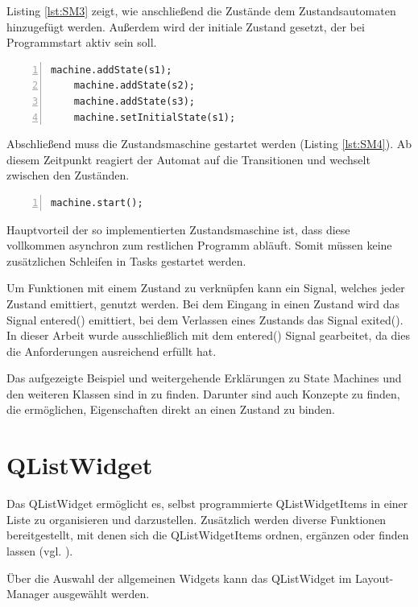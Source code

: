 Listing \ref{lst:SM3} zeigt, wie anschließend die Zustände dem Zustandsautomaten hinzugefügt werden. Außerdem wird der initiale Zustand gesetzt, der bei Programmstart aktiv sein soll. 

\begin{lstlisting}[frame=single, breaklines=true, numbers=left, stepnumber=2, firstnumber=1, numberstyle = \tiny, caption=State Machine Beispiel Teil 3 ,label=lst:SM3]
    machine.addState(s1);
    machine.addState(s2);
    machine.addState(s3);
    machine.setInitialState(s1);
\end{lstlisting}

Abschließend muss die Zustandsmaschine gestartet werden (Listing \ref{lst:SM4}). Ab diesem Zeitpunkt reagiert der Automat auf die Transitionen und wechselt zwischen den Zuständen. 

\begin{lstlisting}[frame=single, breaklines=true, numbers=left, stepnumber=2, firstnumber=1, numberstyle = \tiny, caption=State Machine Beispiel Teil 4 ,label=lst:SM4]
    machine.start();
\end{lstlisting}

Hauptvorteil der so implementierten Zustandsmaschine ist, dass diese vollkommen asynchron zum restlichen Programm abläuft. Somit müssen keine zusätzlichen Schleifen in Tasks gestartet werden. 

Um Funktionen mit einem Zustand zu verknüpfen kann ein Signal, welches jeder Zustand emittiert, genutzt werden. Bei dem Eingang in einen Zustand wird das Signal entered() emittiert, bei dem Verlassen eines Zustands das Signal exited(). In dieser Arbeit wurde ausschließlich mit dem entered() Signal gearbeitet, da dies die Anforderungen ausreichend erfüllt hat. 

Das aufgezeigte Beispiel und weitergehende Erklärungen zu State Machines und den weiteren Klassen sind in \cite{qt_statemachine} zu finden. Darunter sind auch Konzepte zu finden, die ermöglichen, Eigenschaften direkt an einen Zustand zu binden. 

\section{QListWidget}
\label{sec:QListWidgetItem}

Das QListWidget ermöglicht es, selbst programmierte QListWidgetItems in einer Liste zu organisieren und darzustellen. Zusätzlich werden diverse Funktionen bereitgestellt, mit denen sich die QListWidgetItems ordnen, ergänzen oder finden lassen (vgl. \cite{qt_listwidget}). 

Über die Auswahl der allgemeinen Widgets kann das QListWidget im Layout-Manager ausgewählt werden. 
